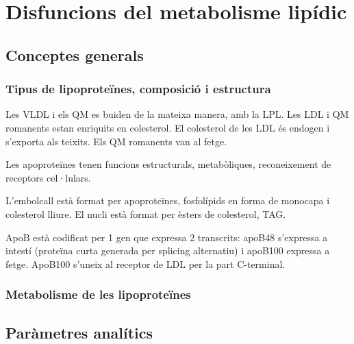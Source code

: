 \section{Disfuncions del metabolisme lipídic}
\label{sec:disf-del-metab}

\subsection{Conceptes generals}
\label{sec:conceptes-generals}

\subsubsection{Tipus de lipoproteïnes, composició i estructura}
\label{sec:tipus-de-lipopr}


Les VLDL i els QM es buiden de la mateixa manera, amb la LPL. Les LDL i QM romanents estan enriquits en colesterol. El colesterol de les LDL és endogen i s'exporta als teixits. Els QM romanents van al fetge.

Les apoproteïnes tenen funcions estructurals, metabòliques, reconeixement de receptors cel·lulars.

L'embolcall està format per apoproteïnes, fosfolípids en forma de monocapa i colesterol lliure. El nucli està format per èsters de colesterol, TAG.


ApoB està codificat per 1 gen que expressa 2 transcrits: apoB48 s'expressa a intestí (proteïna curta generada per splicing alternatiu) i apoB100 expressa a fetge. ApoB100 s'uneix al receptor de LDL per la part C-terminal.


\subsubsection{Metabolisme de les lipoproteïnes}
\label{sec:metabolisme-de-les}



\subsection{Paràmetres analítics}
\label{sec:parametres-analitics}


